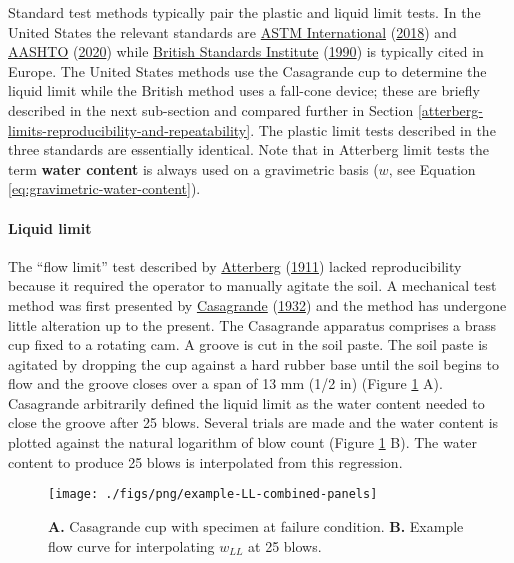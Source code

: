 \documentclass[
  letterpaper,
  openany]{book}
\begin{document}
Standard test methods typically pair the plastic and liquid limit tests.
In the United States the relevant standards are \protect\hyperlink{ref-ASTMD43182018}{ASTM International} (\protect\hyperlink{ref-ASTMD43182018}{2018}) and \protect\hyperlink{ref-AASHTO2020}{AASHTO} (\protect\hyperlink{ref-AASHTO2020}{2020}) while \protect\hyperlink{ref-BS13771990}{British Standards Institute} (\protect\hyperlink{ref-BS13771990}{1990}) is typically cited in Europe.
The United States methods use the Casagrande cup to determine the liquid limit while the British method uses a fall-cone device; these are briefly described in the next sub-section and compared further in Section \ref{atterberg-limits-reproducibility-and-repeatability}.
The plastic limit tests described in the three standards are essentially identical.
Note that in Atterberg limit tests the term \textbf{water content} is always used on a gravimetric basis (\(w\), see Equation \eqref{eq:gravimetric-water-content}).

\hypertarget{liquid-limit-devices}{%
\paragraph{Liquid limit}\label{liquid-limit-devices}}

The ``flow limit'' test described by \protect\hyperlink{ref-Atterberg1911}{Atterberg} (\protect\hyperlink{ref-Atterberg1911}{1911}) lacked reproducibility because it required the operator to manually agitate the soil.
A mechanical test method was first presented by \protect\hyperlink{ref-Casagrande1932}{Casagrande} (\protect\hyperlink{ref-Casagrande1932}{1932}) and the method has undergone little alteration up to the present.
The Casagrande apparatus comprises a brass cup fixed to a rotating cam.
A groove is cut in the soil paste.
The soil paste is agitated by dropping the cup against a hard rubber base until the soil begins to flow and the groove closes over a span of 13 mm (1/2 in) (Figure \ref{fig:ll-test-procedure} A).
Casagrande arbitrarily defined the liquid limit as the water content needed to close the groove after 25 blows.
Several trials are made and the water content is plotted against the natural logarithm of blow count (Figure \ref{fig:ll-test-procedure} B).
The water content to produce 25 blows is interpolated from this regression.

\begin{figure}

{\centering \texttt{[image: ./figs/png/example-LL-combined-panels]} 

}

\caption[Liquid limit test procedure with Casagrande cup]{\textbf{A.} Casagrande cup with specimen at failure condition. \textbf{B.} Example flow curve for interpolating $w_{LL}$ at 25 blows.}\label{fig:ll-test-procedure}
\end{figure}
\end{document}
